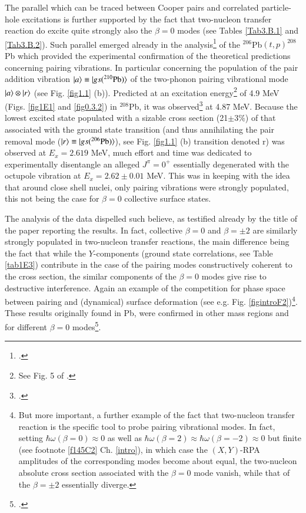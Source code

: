  The parallel which can be traced between Cooper pairs and correlated particle-hole excitations is further supported by the fact that two-nucleon transfer reaction do excite quite strongly also the $\beta=0$ modes (see Tables \ref{Tab3.B.1} and \ref{Tab3.B.2}). 
Such parallel  emerged already in the analysis\footnote{\cite{Broglia:67}.} of the $^{206}$Pb$(t,p)^{208}$Pb which provided the experimental confirmation of the theoretical predictions concerning pairing vibrations. In particular concerning the population of the pair addition vibration $|{a} \rangle\equiv|{gs(^{210}\text{Pb})} \rangle$ of the two-phonon pairing vibrational mode $|{a} \rangle\otimes|{r} \rangle$ (see Fig. \ref{fig1.1} (b)).  Predicted at an excitation energy\footnote{See Fig. 5 of \cite{Bes:66}.} of 4.9 MeV (Figs. \ref{fig1E1} and \ref{fig0.3.2}) in $^{208}$Pb, it was observed\footnote{\cite{Bjerregaard:66b}.} at 4.87 MeV. Because the lowest excited state populated with a sizable cross section (21$\pm3\%$) of that associated with the ground state transition (and thus annihilating the pair removal mode ($|{r} \rangle\equiv|{gs(^{206}\text{Pb})} \rangle$), see Fig. \ref{fig1.1} (b) transition denoted r) was observed at $E_x=2.619$ MeV, much effort and time was dedicated to experimentally disentangle an alleged $J^\pi=0^+$ essentially degenerated with the octupole vibration at $E_x=2.62\pm0.01$ MeV.  This was in keeping with the idea that around close shell nuclei, only pairing vibrations were strongly populated, this not being the case for $\beta=0$ collective surface states. 

The analysis of the data dispelled such believe, as testified already by the title of the paper reporting the results. In fact, collective $\beta=0$ and $\beta=\pm2$ are similarly strongly populated in two-nucleon transfer reactions, the main difference being the fact that while the $Y$-components (ground state correlations, see Table  \ref{tab1E3}) contribute in the case of the pairing modes constructively coherent to the cross section, the similar components of the $\beta=0$ modes give rise to destructive interference. Again an example of the competition for phase space between pairing and (dynamical) surface deformation (see e.g. Fig. \ref{figintroF2})\footnote{But more important, a further example of the fact that two-nucleon transfer reaction is the specific tool to probe pairing vibrational modes. In fact, setting $\hbar\omega(\beta=0)\approx0$ as well as $\hbar\omega(\beta=2)\approx\hbar\omega(\beta=-2)\approx0$ but finite (see footnote \ref{f145C2} Ch. \ref{intro}), in which case the $(X,Y)$-RPA amplitudes of the corresponding modes become about equal, the two-nucleon absolute cross section associated with the $\beta=0$ mode vanish, while that of the $\beta=\pm2$ essentially diverge.}. These results originally found in Pb, were confirmed in other mass regions and for different $\beta=0$ modes\footnote{\cite{Broglia:71}.}. 



